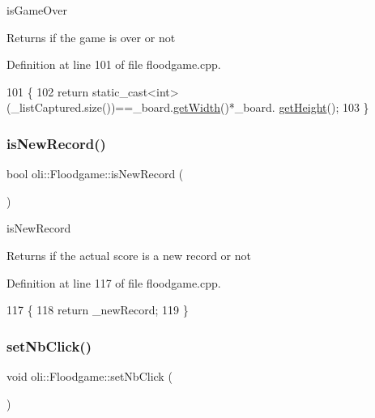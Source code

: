 is\+Game\+Over 

\begin{DoxyReturn}{Returns}
if the game is over or not 
\end{DoxyReturn}


Definition at line 101 of file floodgame.\+cpp.


\begin{DoxyCode}
101                           \{
102     \textcolor{keywordflow}{return} \textcolor{keyword}{static\_cast<}\textcolor{keywordtype}{int}\textcolor{keyword}{>}(\_listCaptured.size())==\_board.\hyperlink{classoli_1_1_board_a228d72d2aa8a9df2f545ecef14e72a0d}{getWidth}()*\_board.
      \hyperlink{classoli_1_1_board_a17dce7dacfe888f52dfad0468ae51ace}{getHeight}();
103 \}
\end{DoxyCode}
\hypertarget{classoli_1_1_floodgame_a35b5e1c7f39c73d7d46b8c71156fbfbc}{}\label{classoli_1_1_floodgame_a35b5e1c7f39c73d7d46b8c71156fbfbc} 
\subsubsection{\texorpdfstring{is\+New\+Record()}{isNewRecord()}}
{\footnotesize\ttfamily bool oli\+::\+Floodgame\+::is\+New\+Record (\begin{DoxyParamCaption}{ }\end{DoxyParamCaption})}



is\+New\+Record 

\begin{DoxyReturn}{Returns}
if the actual score is a new record or not 
\end{DoxyReturn}


Definition at line 117 of file floodgame.\+cpp.


\begin{DoxyCode}
117                            \{
118     \textcolor{keywordflow}{return} \_newRecord;
119 \}
\end{DoxyCode}
\hypertarget{classoli_1_1_floodgame_ad30fd6f491f98397de7eb46fcc96c875}{}\label{classoli_1_1_floodgame_ad30fd6f491f98397de7eb46fcc96c875} 
\subsubsection{\texorpdfstring{set\+Nb\+Click()}{setNbClick()}}
{\footnotesize\ttfamily void oli\+::\+Floodgame\+::set\+Nb\+Click (\begin{DoxyParamCaption}{ }\end{DoxyParamCaption})}



